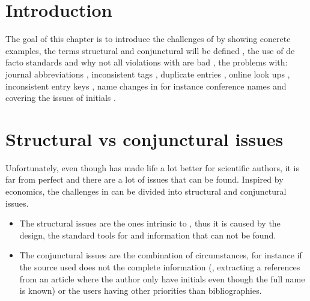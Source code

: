 
\section{Introduction}
The goal of this chapter is to introduce the challenges of {\bibtex}
by showing concrete examples, the terms structural and conjunctural
will be defined , the
use of de facto standards and why not all violations with {\bibtex}
are bad , the problems with: journal
abbreviations , inconsistent tags
, duplicate entries
, online look ups
, inconsistent entry keys
, name changes in for instance
conference names  and covering the
issues of initials .



\section{Structural vs conjunctural issues}
\label{sec:problems_structural_conjunctural}

Unfortunately, even though {\bibtex} has made life a lot better for
scientific authors, it is far from perfect and there are a lot of
issues that can be found.  Inspired by economics, the challenges in
{\bibtex} can be divided into structural and conjunctural issues. 

\begin{itemize}
\item The structural issues are the ones intrinsic to {\bibtex}, thus
  it is caused by the design, the standard tools for {\bibtex} and
  information that can not be found.

\item The conjunctural issues are the combination of circumstances,
  for instance if the source used does not the complete information
  (\eg, extracting a references from an article where the author only
  have initials even though the full name is known) or the users
  having other priorities than bibliographies.
\end{itemize}

